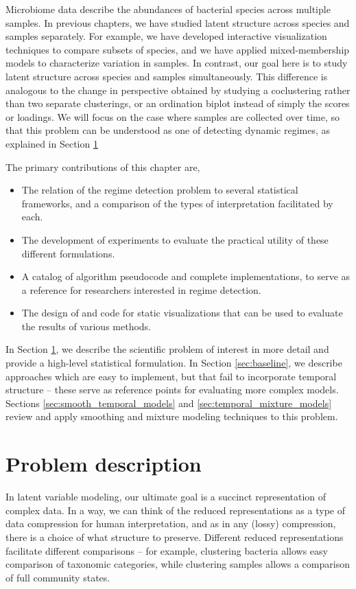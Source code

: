 \documentclass[14pt]{extarticle}
\begin{document}
Microbiome data describe the abundances of bacterial species across multiple
samples. In previous chapters, we have studied latent structure across species
and samples separately. For example, we have developed interactive visualization
techniques to compare subsets of species, and we have applied mixed-membership
models to characterize variation in samples. In contrast, our goal here is to
study latent structure across species and samples simultaneously. This
difference is analogous to the change in perspective obtained by studying a
coclustering rather than two separate clusterings, or an ordination biplot
instead of simply the scores or loadings. We will focus on the case where
samples are collected over time, so that this problem can be understood as one
of detecting dynamic regimes, as explained in Section
\ref{sec:problem_description}

The primary contributions of this chapter are,
\begin{itemize}
\item The relation of the regime detection problem to several statistical
  frameworks, and a comparison of the types of interpretation facilitated by
  each.
\item The development of experiments to evaluate the practical utility of these
  different formulations.
\item A catalog of algorithm pseudocode and complete implementations, to serve as a
  reference for researchers interested in regime detection.
\item The design of and code for static visualizations that can be used to
  evaluate the results of various methods.
\end{itemize}

In Section \ref{sec:problem_description}, we describe the scientific problem of
interest in more detail and provide a high-level statistical formulation. In
Section \ref{sec:baseline}, we describe approaches which are easy to implement,
but that fail to incorporate temporal structure -- these serve as reference
points for evaluating more complex models. Sections
\ref{sec:smooth_temporal_models} and \ref{sec:temporal_mixture_models}
review and apply smoothing and mixture modeling techniques to this problem.

\section{Problem description}
\label{sec:problem_description}

In latent variable modeling, our ultimate goal is a succinct representation of
complex data. In a way, we can think of the reduced representations as a type of
data compression for human interpretation, and as in any (lossy) compression,
there is a choice of what structure to preserve. Different reduced
representations facilitate different comparisons -- for example, clustering
bacteria allows easy comparison of taxonomic categories, while clustering
samples allows a comparison of full community states.
\end{document}
